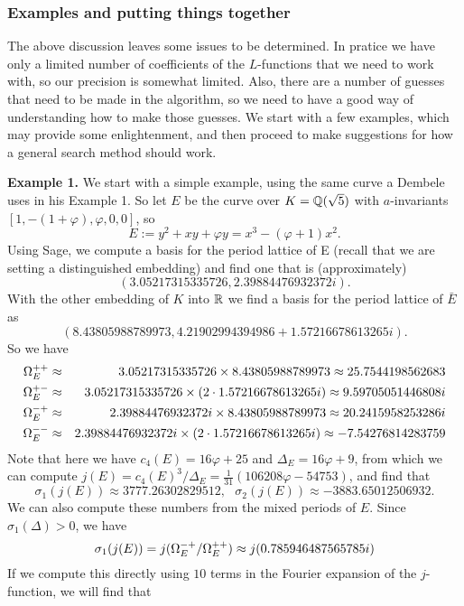 \subsubsection{Examples and putting things together}
The above discussion leaves some issues to be determined. In pratice we have only a limited number of coefficients
of the $L$-functions that we need to work with, so our precision is somewhat limited. Also, there are a number
of guesses that need to be made in the algorithm, so we need to have a good way of understanding how to make those
guesses. We start with a few examples, which may provide some enlightenment, and then proceed to make
suggestions for how a general search method should work.

\textbf{Example 1.} We start with a simple example, using the same curve a Dembele uses in his Example 1. So let
$E$ be the curve over $K = \mathbb{Q}( \sqrt 5)$ with $a$-invariants $[1, -(1+\varphi), \varphi, 0, 0]$, so
\[
    E := y^2 + xy + \varphi y = x^3 - (\varphi+1)x^2.
\]
Using Sage, we compute a basis for the period lattice of E (recall that we are setting a 
distinguished embedding) and find one that is (approximately)
\[
(3.05217315335726, 2.39884476932372i).
\]
With the other embedding of $K$ into $\mathbb{R}$ we find a basis for the period lattice of $\bar E$ as
\[
(8.43805988789973, 4.21902994394986 + 1.57216678613265i).
\]
So we have
\begin{eqnarray*}
    \Omega^{++}_E &\approx& 3.05217315335726 \times 8.43805988789973 \approx 25.7544198562683 \\
    \Omega^{+-}_E &\approx& 3.05217315335726 \times (2 \cdot 1.57216678613265 i) \approx 9.59705051446808i \\
    \Omega^{-+}_E &\approx& 2.39884476932372i \times 8.43805988789973 \approx 20.2415958253286i \\
    \Omega^{--}_E &\approx& 2.39884476932372i \times (2 \cdot 1.57216678613265 i) \approx -7.54276814283759
\end{eqnarray*}
Note that here we have $c_4(E) = 16 \varphi + 25$ and $\Delta_E = 16 \varphi + 9$, from which we can compute
$j(E) = c_4(E)^3/\Delta_E = \frac{1}{31}(106208\varphi - 54753)$, and find that
\[
    \sigma_1(j(E)) \approx 3777.26302829512, \ \ \  \sigma_2(j(E)) \approx -3883.65012506932.
\]
We can also compute these numbers from the mixed periods of $E$. Since $\sigma_1(\Delta) > 0$, we have
\[
    \sigma_1(j(E)) = j(\Omega^{-+}_E/\Omega^{++}_E) \approx j(0.785946487565785i)
\]
If we compute this directly using $10$ terms in the Fourier expansion of the $j$-function, we will find that
